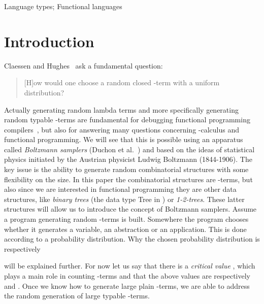 \documentclass{sig-alternate}
\begin{document}
\ifICFP
\begin{sloppypar}
     { Language types;} {
    Functional languages} 
\end{sloppypar}
\fi


\section{Introduction}
Claessen and Hughes~\cite{DBLP:conf/icfp/ClaessenH00} ask a fundamental question:
\begin{it}
  \begin{quotation} [H]ow would one choose a random closed \mbox{-term} with a uniform
    distribution?
  \end{quotation}
\end{it}
Actually generating random lambda terms and more specifically generating random
typable -terms are fundamental for debugging functional programming
compilers~\cite{Palka:2011:TOC:1982595.1982615}, but also for answering many
questions concerning -calculus and functional programming.  We will see that this
is possible using an apparatus called \emph{Boltzmann samplers} (Duchon et
al.~\cite{DBLP:journals/cpc/DuchonFLS04}) and based on the ideas of statistical
physics initiated by the Austrian physicist Ludwig Boltzmann (1844-1906).  The key
issue is the ability to generate random combinatorial structures with some
flexibility on the size. In this paper the combinatorial structures are
\mbox{-terms}, but also since we are interested in functional programming they
are other data structures, like \emph{binary trees} (the data type \textsf{Tree}
in \cite{DBLP:conf/icfp/ClaessenH00}) or \emph{1-2-trees}.  These latter  structures
will allow us to introduce the concept of Boltzmann samplers.  Assume a program
generating random -terms is built.  Somewhere the program chooses whether it generates a
variable, an abstraction or an application. This is done according to a probability
distribution.  Why the chosen probability distribution is
respectively

will be explained further.  For now let us say that there is a  \emph{critical value}
,  which plays a main role in counting
-terms and that the above values are respectively  and .  Once
we know how to generate large plain -terms, we are able to address the
random generation of large typable -terms.
\end{document}
